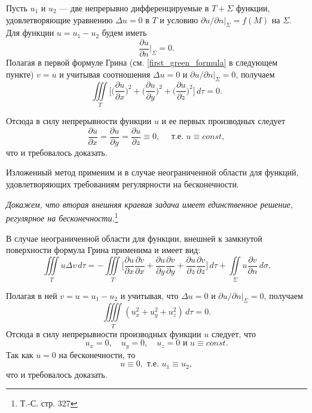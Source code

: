 Пусть $u_1$ и $u_2$ --- две непрерывно дифференцируемые в $T + \Sigma$ функции, удовлетворяющие уравнению $\Delta u = 0$ в $T$ и условию $\partial u/ \partial n |_{\Sigma} = f(M)$ на $\Sigma$. Для функции $u = u_1 - u_2$ будем иметь 
\begin{equation*}
	\frac{\partial u}{\partial n} \Big|_{\Sigma} = 0.
\end{equation*}
Полагая в первой формуле Грина (см. \eqref{first_green_formula} в следующем пункте) $v = u$ и учитывая соотношения $\Delta u = 0$ и $\partial u / \partial n |_{\Sigma} = 0$, получаем 
\begin{equation*}
	 \iiint \limits_{T} \Bigg[\Bigg(\frac{\partial u}{\partial x}\Bigg)^2 + \Bigg(\frac{\partial u}{\partial y}\Bigg)^2 + \Bigg(\frac{\partial u}{\partial z}\Bigg)^2\Bigg] \, d\tau = 0.
\end{equation*}

Отсюда в силу непрерывности функции $u$ и ее первых производных следует 
\begin{equation*}
	\frac{\partial u}{\partial x} = \frac{\partial u}{\partial y} = \frac{\partial u}{\partial z} \equiv 0, \quad \text{ т.е. } u \equiv const,
\end{equation*}
что и требовалось доказать. 

Изложенный метод применим и в случае неограниченной области для функций, удовлетворяющих требованиям регулярности на бесконечности.
\newline 

\textit{Докажем, что вторая внешняя краевая задача имеет единственное решение, регулярное на бесконечности.}\footnote{Т.-С. стр. 327}


В случае неограниченной области для функции, внешней к замкнутой поверхности формула Грина применима и имеет вид:
\begin{equation} \label{out_green}
	\iiint \limits_{T} u \Delta v \, d\tau = - \iiint \limits_{T} \Bigg[\frac{\partial u}{\partial x}\frac{\partial v}{\partial x} + \frac{\partial u}{\partial y}\frac{\partial v}{\partial y} + \frac{\partial u}{\partial z}\frac{\partial v}{\partial z}\Bigg] \, d\tau + \iint \limits_{\Sigma} u \frac{\partial v}{\partial n} \, d\sigma.
\end{equation}

Полагая в ней $v = u = u_1 - u_2$ и учитывая, что $\Delta u = 0$ и $\partial u / \partial n |_{\Sigma} = 0$, получаем
\begin{equation}
	\iiiint \limits_{T} (u_x^2 + u_y^2 + u_z^2) \, d\tau = 0.
\end{equation}
Отсюда в силу непрерывности производных функции $u$ следует, что 
\begin{equation*}
	u_x = 0, \quad u_y = 0, \quad u_z = 0 \text{ и } u \equiv const. 
\end{equation*}
Так как $u = 0$ на бесконечности, то
\begin{equation}
	u \equiv 0, \text{ т.е. } u_1 \equiv u_2,
\end{equation}
что и требовалось доказать.  